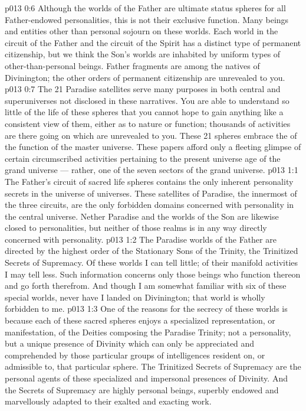 \vs p013 0:6 \pc Although the worlds of the Father are ultimate status spheres for all Father\hyp{}endowed personalities, this is not their exclusive function. Many beings and entities other than personal sojourn on these worlds. Each world in the circuit of the Father and the circuit of the Spirit has a distinct type of permanent citizenship, but we think the Son’s worlds are inhabited by uniform types of other\hyp{}than\hyp{}personal beings. Father fragments are among the natives of Divinington; the other orders of permanent citizenship are unrevealed to you.
\vs p013 0:7 The 21 Paradise satellites serve many purposes in both central and superuniverses not disclosed in these narratives. You are able to understand so little of the life of these spheres that you cannot hope to gain anything like a consistent view of them, either as to nature or function; thousands of activities are there going on which are unrevealed to you. These 21 spheres embrace the  of the function of the master universe. These papers afford only a fleeting glimpse of certain circumscribed activities pertaining to the present universe age of the grand universe --- rather, one of the seven sectors of the grand universe.
\vs p013 1:1 The Father’s circuit of sacred life spheres contains the only inherent personality secrets in the universe of universes. These satellites of Paradise, the innermost of the three circuits, are the only forbidden domains concerned with personality in the central universe. Nether Paradise and the worlds of the Son are likewise closed to personalities, but neither of those realms is in any way directly concerned with personality.
\vs p013 1:2 The Paradise worlds of the Father are directed by the highest order of the Stationary Sons of the Trinity, the Trinitized Secrets of Supremacy. Of these worlds I can tell little; of their manifold activities I may tell less. Such information concerns only those beings who function thereon and go forth therefrom. And though I am somewhat familiar with six of these special worlds, never have I landed on Divinington; that world is wholly forbidden to me.
\vs p013 1:3 One of the reasons for the secrecy of these worlds is because each of these sacred spheres enjoys a specialized representation, or manifestation, of the Deities composing the Paradise Trinity; not a personality, but a unique presence of Divinity which can only be appreciated and comprehended by those particular groups of intelligences resident on, or admissible to, that particular sphere. The Trinitized Secrets of Supremacy are the personal agents of these specialized and impersonal presences of Divinity. And the Secrets of Supremacy are highly personal beings, superbly endowed and marvellously adapted to their exalted and exacting work.
